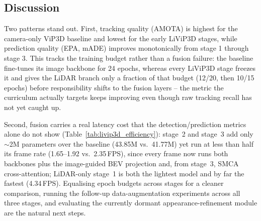 \documentclass[12pt,a4paper]{report}
\begin{document}
\subsection{Discussion}
\quad Two patterns stand out. First, tracking quality (AMOTA) is highest for the camera-only ViP3D baseline and lowest for the early LiViP3D stages, while prediction quality (EPA, mADE) improves monotonically from stage 1 through stage 3. This tracks the training budget rather than a fusion failure: the baseline fine-tunes its image backbone for 24 epochs, whereas every LiViP3D stage freezes it and gives the LiDAR branch only a fraction of that budget (12/20, then 10/15 epochs) before responsibility shifts to the fusion layers -- the metric the curriculum actually targets keeps improving even though raw tracking recall has not yet caught up.

\quad Second, fusion carries a real latency cost that the detection/prediction metrics alone do not show (Table~\ref{tab:livip3d_efficiency}): stage~2 and stage~3 add only $\sim$2M parameters over the baseline (43.85M vs.\ 41.77M) yet run at less than half its frame rate (1.65--1.92 vs.\ 2.35\,FPS), since every frame now runs both backbones plus the image-guided BEV projection and, from stage~3, SMCA cross-attention; LiDAR-only stage~1 is both the lightest model and by far the fastest (4.34\,FPS). Equalising epoch budgets across stages for a cleaner comparison, running the follow-up data-augmentation experiments across all three stages, and evaluating the currently dormant appearance-refinement module are the natural next steps.



\end{document}
